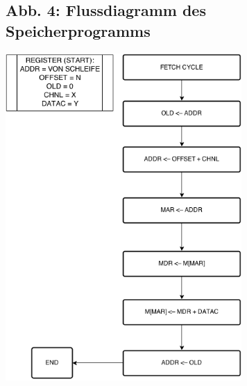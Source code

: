 \documentclass[12pt,titlepage]{article}
\begin{document}
\subsection{Abb. 4: Flussdiagramm des Speicherprogramms}
\includegraphics[width=9cm]{saveToHS.png}
\end{document}

